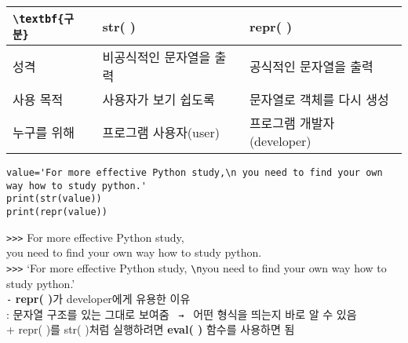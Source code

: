 \documentclass[11pt,a4paper]{article}
\begin{document}
\begin{spacing}{1.5}
\begin{tabular}{|>{\centering\arraybackslash}m{4cm}|>{\centering\arraybackslash}m{6cm}|>{\centering\arraybackslash}m{6cm}|}
\hline
\rowcolors[gray]{0.9}
\verb|\textbf{구분}| & \textbf{str( )} & \textbf{repr( )}\\
\hline
성격 & 비공식적인 문자열을 출력 & 공식적인 문자열을 출력\\
\hline
사용 목적 & 사용자가 보기 쉽도록 & 문자열로 객체를 다시 생성\\
\hline
누구를 위해 & 프로그램 사용자(user) & 프로그램 개발자(developer)\\
\hline
\end{tabular}
\begin{lstlisting}[label={list:first},caption=str( ) \texttt{\&} repr( )]
value='For more effective Python study,\n you need to find your own way how to study python.'
print(str(value))
print(repr(value))
\end{lstlisting}
\verb|>>>| For more effective Python study,\\
\hspace*{2em}you need to find your own way how to study python.\\
\verb|>>>| `For more effective Python study, \verb|\n|you need to find your own way how to study python.'\\

\texttt{-} \textbf{repr( )}가 developer에게 유용한 이유\\
: 문자열 구조를 있는 그대로 보여줌 \texttt{ → } 어떤 형식을 띄는지 바로 알 수 있음\\

+ repr( )를 str( )처럼 실행하려면 \textbf{eval( )} 함수를 사용하면 됨
\end{spacing}
\end{document}
